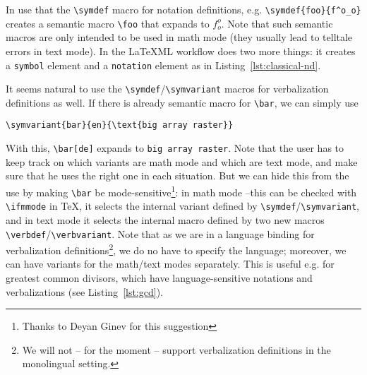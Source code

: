 \documentclass{bluenote}
\def\latexml{{\LaTeX}ML\xspace}
\def\lstomdoc{\lstinline[language={[1.3]OMDoc},mathescape]}
\begin{document}
In \sTeX use that the \lstinline|\symdef| macro for notation definitions,
e.g. \lstinline|\symdef{foo}{f^o_o}| creates a semantic macro \lstinline|\foo| that
expands to $f_o^o$. Note that such semantic macros are only intended to be used in math
mode (they usually lead to telltale errors in text mode). In the \latexml workflow does
two more things: it creates a \lstomdoc|symbol| element and a \lstomdoc|notation| element
as in Listing~\ref{lst:classical-nd}.

It seems natural to use the \lstinline|\symdef|/\lstinline|\symvariant| macros for
verbalization definitions as well. If there is already semantic macro for
\lstinline|\bar|, we can simply use
\begin{lstlisting}
\symvariant{bar}{en}{\text{big array raster}}
\end{lstlisting}
With this, \lstinline|\bar[de]| expands to \lstinline|big array raster|. Note that the
user has to keep track on which variants are math mode and which are text mode, and make
sure that he uses the right one in each situation. But we can hide this from the use by
making \lstinline|\bar| be mode-sensitive\footnote{Thanks to Deyan Ginev for this
  suggestion}: in math mode --this can be checked with \lstinline|\ifmmode| in \TeX, it
selects the internal variant defined by \lstinline|\symdef|/\lstinline|\symvariant|, and
in text mode it selects the internal macro defined by two new macros
\lstinline|\verbdef|/\lstinline|\verbvariant|. Note that as we are in a language binding
for verbalization definitions\footnote{We will not -- for the moment -- support
  verbalization definitions in the monolingual setting.}, we do no have to specify the
language; moreover, we can have variants for the math/text modes separately. This is
useful e.g. for greatest common divisors, which have language-sensitive notations and
verbalizations (see Listing~\ref{lst:gcd}).
\end{document}
